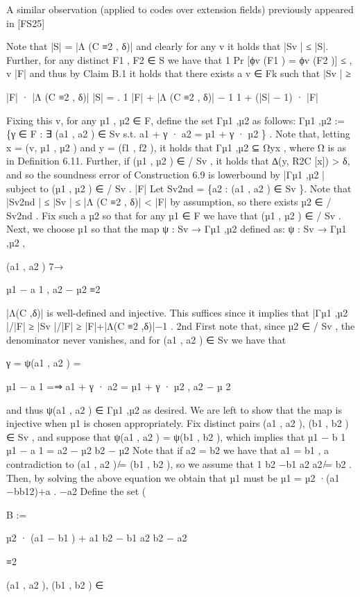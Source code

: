 \documentclass[11pt]{article}
\begin{document}
A similar observation (applied to codes over extension fields) previously appeared in [FS25]

Note that |S| = |Λ (C ≡2 , δ)| and clearly for any v it holds that |Sv | ≤ |S|. Further, for any distinct
F1 , F2 ∈ S we have that
1
Pr [ϕv (F1 ) = ϕv (F2 )] ≤
,
v
|F|
and thus by Claim B.1 it holds that there exists a v ∈ Fk such that
|Sv | ≥

|F| · |Λ (C ≡2 , δ)|
|S|
=
.
1
|F| + |Λ (C ≡2 , δ)| − 1
1 + (|S| − 1) · |F|

Fixing this v, for any µ1 , µ2 ∈ F, define the set Γµ1 ,µ2 as follows:
Γµ1 ,µ2 := \{γ ∈ F : ∃ (a1 , a2 ) ∈ Sv s.t. a1 + γ · a2 = µ1 + γ · µ2 \} .
Note that, letting x = (v, µ1 , µ2 ) and y = (f1 , f2 ), it holds that Γµ1 ,µ2 ⊆ Ωyx , where Ω is as in
Definition 6.11. Further, if (µ1 , µ2 ) ∈
/ Sv , it holds that ∆(y, R2C [x]) > δ, and so the soundness error
of Construction 6.9 is lowerbound by
|Γµ1 ,µ2 |
subject to (µ1 , µ2 ) ∈
/ Sv .
|F|
Let Sv2nd = \{a2 : (a1 , a2 ) ∈ Sv \}. Note that |Sv2nd | ≤ |Sv | ≤ |Λ (C ≡2 , δ)| < |F| by assumption, so
there exists µ2 ∈
/ Sv2nd . Fix such a µ2 so that for any µ1 ∈ F we have that (µ1 , µ2 ) ∈
/ Sv . Next, we
choose µ1 so that the map ψ : Sv → Γµ1 ,µ2 defined as:
ψ : Sv → Γµ1 ,µ2 ,

(a1 , a2 ) 7→

µ1 − a 1
,
a2 − µ2
≡2

|Λ(C ,δ)|
is well-defined and injective. This suffices since it implies that |Γµ1 ,µ2 |/|F| ≥ |Sv |/|F| ≥ |F|+|Λ(C
≡2 ,δ)|−1 .
2nd
First note that, since µ2 ∈
/ Sv , the denominator never vanishes, and for (a1 , a2 ) ∈ Sv we have that

γ = ψ(a1 , a2 ) =

µ1 − a 1
=⇒ a1 + γ · a2 = µ1 + γ · µ2 ,
a2 − µ 2

and thus ψ(a1 , a2 ) ∈ Γµ1 ,µ2 as desired. We are left to show that the map is injective when µ1
is chosen appropriately. Fix distinct pairs (a1 , a2 ), (b1 , b2 ) ∈ Sv , and suppose that ψ(a1 , a2 ) =
ψ(b1 , b2 ), which implies that
µ1 − b 1
µ1 − a 1
=
a2 − µ2
b2 − µ2
Note that if a2 = b2 we have that a1 = b1 , a contradiction to (a1 , a2 ) ̸= (b1 , b2 ), so we assume that
1 b2 −b1 a2
a2 ̸= b2 . Then, by solving the above equation we obtain that µ1 must be µ1 = µ2 ·(a1 −bb12)+a
.
−a2
Define the set
(

B :=

µ2 · (a1 − b1 ) + a1 b2 − b1 a2
b2 − a2

≡2

(a1 , a2 ), (b1 , b2 ) ∈
\end{document}
